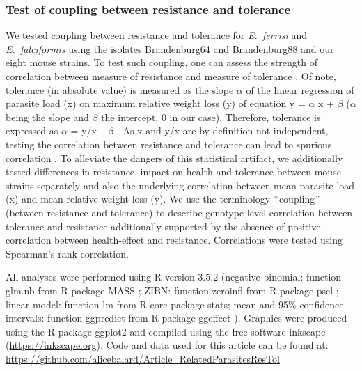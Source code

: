 \subsubsection{Test of coupling between resistance and tolerance}

We tested coupling between resistance and tolerance for \textit{E.~ferrisi} and \textit{E.~falciformis }using the isolates Brandenburg64 and Brandenburg88 and our eight mouse strains. To test such coupling, one can assess the strength of correlation between measure of resistance and measure of tolerance \citep{raaberg_disentangling_2007}. Of note, tolerance (in absolute value) is measured as the slope $ \alpha $  of the linear regression of parasite load (x) on maximum relative weight loss (y) of equation y = $ \alpha $ x + $ \beta $  ($ \alpha $  being the slope and $ \beta $  the intercept, 0 in our case). Therefore, tolerance is expressed as $ \alpha $  = y/x – $ \beta $ . As x and y/x are by definition not independent, testing the correlation between resistance and tolerance can lead to spurious correlation \citep{Brett2004}. To alleviate the dangers of this statistical artifact, we additionally tested differences in resistance, impact on health and tolerance between mouse strains separately and also the underlying correlation between mean parasite load (x) and mean relative weight loss (y). We use the terminology $``$coupling$"$  (between resistance and tolerance) to describe genotype-level correlation between tolerance and resistance additionally supported by the absence of positive correlation between health-effect and resistance. Correlations were tested using Spearman’s rank correlation.\par

All analyses were performed using R version 3.5.2 \citep{R_2010}(negative binomial: function glm.nb from R package MASS \citep{venables_modern_2002}; ZIBN: function zeroinfl from R package pscl \citep{Jackman2020, Zeileis2008}; linear model: function lm from R core package stats; mean and 95$\%$  confidence intervals: function ggpredict from R package ggeffect \citep{Ldecke2018}). Graphics were prod\textcolor[HTML]{00000A}{uced using the R package ggplot2 \citep{wickham_ggplot2_2016} and compiled using the free software inkscape (\href{https://inkscape.org/}{https://inkscape.org}). Code and data used for this article can be found at: \href{https://github.com/alicebalard/Article_RelatedParasitesResTol}{https://github.com/alicebalard/Article\_RelatedParasitesResTol}}\par

